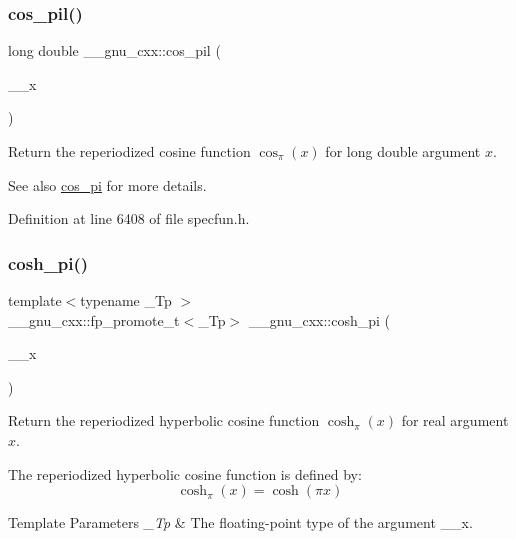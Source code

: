 \subsubsection{\texorpdfstring{cos\+\_\+pil()}{cos\_pil()}}
{\footnotesize\ttfamily long double \+\_\+\+\_\+gnu\+\_\+cxx\+::cos\+\_\+pil (\begin{DoxyParamCaption}\item[{long double}]{\+\_\+\+\_\+x }\end{DoxyParamCaption})\hspace{0.3cm}{\ttfamily [inline]}}

Return the reperiodized cosine function $ \cos_\pi(x) $ for {\ttfamily long double} argument $ x $.

\begin{DoxySeeAlso}{See also}
\hyperlink{group__gnu__math__spec__func_gafc4698ae591b0e9e61285b0794d43ef4}{cos\+\_\+pi} for more details. 
\end{DoxySeeAlso}


Definition at line 6408 of file specfun.\+h.

\mbox{\label{group__gnu__math__spec__func_gaf59c68a01adfdab0f22c4fb405ab2a36}} 
\subsubsection{\texorpdfstring{cosh\+\_\+pi()}{cosh\_pi()}}
{\footnotesize\ttfamily template$<$typename \+\_\+\+Tp $>$ \\
\+\_\+\+\_\+gnu\+\_\+cxx\+::fp\+\_\+promote\+\_\+t$<$\+\_\+\+Tp$>$ \+\_\+\+\_\+gnu\+\_\+cxx\+::cosh\+\_\+pi (\begin{DoxyParamCaption}\item[{\+\_\+\+Tp}]{\+\_\+\+\_\+x }\end{DoxyParamCaption})\hspace{0.3cm}{\ttfamily [inline]}}

Return the reperiodized hyperbolic cosine function $ \cosh_\pi(x) $ for real argument $ x $.

The reperiodized hyperbolic cosine function is defined by\+: \[ \cosh_\pi(x) = \cosh(\pi x) \]


\begin{DoxyTemplParams}{Template Parameters}
{\em \+\_\+\+Tp} & The floating-\/point type of the argument {\ttfamily \+\_\+\+\_\+x}. \\
\hline
\end{DoxyTemplParams}

